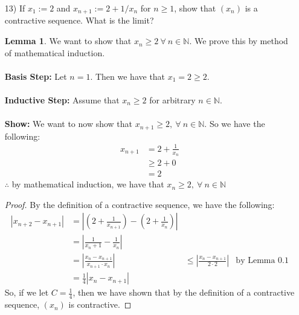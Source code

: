 \documentclass[12pt,letterpaper]{article}
\newcommand{\abs}[1]{\left\lvert #1 \right\rvert}
\newcommand{\N}{\mathbb{N}}
\theoremstyle{case}
\theoremstyle{definition}
\newtheorem{lemma}[theorem]{Lemma}
\begin{document}
\begin{enumerate}
\begin{enumerate}
			\item[13)] If $x_1:=2$ and $x_{n+1}:=2+1/x_n$ for $n \geq 1$, show that $(x_n)$ is a contractive sequence. What is the limit?
			\begin{lemma}
				We want to show that $x_n\geq 2\ \forall\ n \in \N$. We prove this by method of mathematical induction.
				\\\\\textbf{Basis Step:} Let $n=1$. Then we have that $x_1=2 \geq 2$.
				\\\\\textbf{Inductive Step:} Assume that $x_n \geq 2$ for arbitrary $n \in \N$.
				\\\\\textbf{Show:} We want to now show that $x_{n+1} \geq 2,\ \forall\ n \in \N$. So we have the following:
				\begin{align*}
					x_{n+1} &= 2 + \frac{1}{x_n} \\
					&\geq 2+0 \\
					&=2
				\end{align*}
				$\therefore$ by mathematical induction, we have that $x_n\geq 2,\ \forall\ n \in \N$
			\end{lemma}
			
			\begin{proof}
				By the definition of a contractive sequence, we have the following:
				\begin{align*}
					|x_{n+2}-x_{n+1}| &= \abs{\left(2+\frac{1}{x_{n+1}}\right)- \left(2+\frac{1}{x_n}\right)} \\
					&=\abs{\frac{1}{x_n+1}-\frac{1}{x_n}} \\
					&= \abs{\frac{x_n-x_{n+1}}{x_{n+1} \cdot x_n}}
					&\leq \abs{\frac{x_n-x_{n+1}}{2 \cdot 2}} &\text{by Lemma 0.1} \\
					&= \frac{1}{4}|x_n-x_{n+1}|
				\end{align*}
				So, if we let $C=\frac{1}{4}$, then we have shown that by the definition of a contractive sequence, $(x_n)$ is contractive. 
				

\end{proof}
\end{enumerate}
\end{enumerate}
\end{document}

